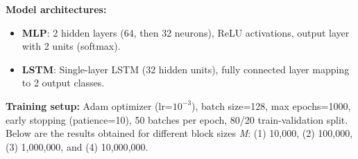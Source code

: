 \documentclass{article}
\begin{document}
{\textbf{Model architectures:}}
\begin{itemize}
    \item {\textbf{MLP}: 2 hidden layers (64, then 32 neurons), ReLU activations, output layer with 2 units (softmax).}
    \item {\textbf{LSTM}: Single-layer LSTM (32 hidden units), fully connected layer mapping to 2 output classes.}
\end{itemize}

{\textbf{Training setup:} Adam optimizer (lr=$10^{-3}$), batch size=128, max epochs=1000, early stopping (patience=10), 50 batches per epoch, 80/20 train-validation split.}\\

Below are the results obtained for different block sizes \textit{M}: (1) 10{,}000, (2) 100{,}000, (3) 1{,}000{,}000, and (4) 10{,}000{,}000.
\end{document}
